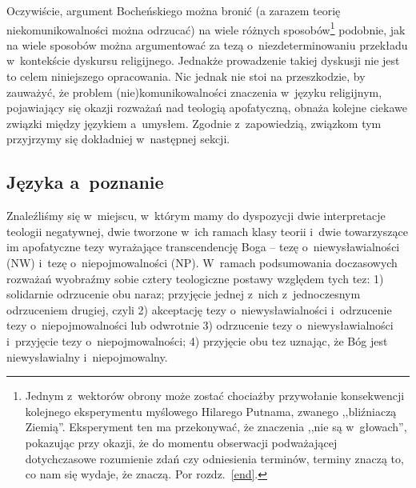 Oczywiście, argument Bocheńskiego można bronić (a zarazem teorię niekomunikowalności można odrzucać) na wiele różnych sposobów\footnote{Jednym z~wektorów obrony może zostać chociażby przywołanie konsekwencji kolejnego eksperymentu myślowego Hilarego Putnama, zwanego ,,bliźniaczą Ziemią''. Eksperyment ten ma przekonywać, że znaczenia ,,nie są w~głowach'', pokazując przy okazji, że do momentu obserwacji podważającej dotychczasowe rozumienie zdań czy odniesienia terminów, terminy znaczą to, co nam się wydaje, że znaczą. Por rozdz.~\ref{end}.} podobnie, jak na wiele sposobów można argumentować za tezą o~niezdeterminowaniu przekładu w~kontekście dyskursu religijnego. Jednakże prowadzenie takiej dyskusji nie jest to celem niniejszego opracowania. Nic jednak nie stoi na przeszkodzie, by zauważyć, że problem (nie)komunikowalności znaczenia w~języku religijnym, pojawiający się okazji rozważań nad teologią apofatyczną, obnaża kolejne ciekawe związki między językiem a~umysłem. Zgodnie z~zapowiedzią, związkom tym przyjrzymy się dokładniej w~następnej sekcji.


\subsection{Języka a~poznanie}

Znaleźliśmy się w~miejscu, w~którym mamy do dyspozycji dwie interpretacje teologii negatywnej, dwie tworzone w~ich ramach klasy teorii i~dwie towarzyszące im apofatyczne tezy wyrażające transcendencję Boga -- tezę o~niewysławialności (NW) i~tezę o~niepojmowalności (NP). W~ramach podsumowania doczasowych rozważań wyobraźmy sobie cztery teologiczne postawy względem tych tez: 1) solidarnie odrzucenie obu naraz; przyjęcie jednej z~nich z~jednoczesnym odrzuceniem drugiej, czyli 2) akceptację tezy o~niewysławialności i~odrzucenie tezy o~niepojmowalności lub odwrotnie 3) odrzucenie tezy o~niewysławialności i~przyjęcie tezy o~niepojmowalności; 4) przyjęcie obu tez uznając, że Bóg jest niewysławialny i~niepojmowalny.

